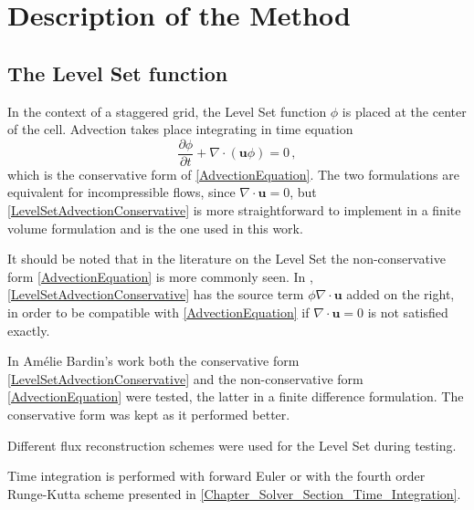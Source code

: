 \documentclass[11pt, a4paper, oneside, openany]{book}
\begin{document}
\section{Description of the Method}\label{Chapter_Implementation_Description_of_the_Method}
\subsection{The Level Set function}
In the context of a staggered grid, the Level Set function $\phi$ is placed at the center of the cell. Advection takes place integrating in time equation
\begin{equation}
\dfrac{\partial\phi}{\partial t}+\nabla\cdot\left(\boldsymbol{u}\phi\right)=0\,,\label{LevelSetAdvectionConservative}
\end{equation}
which is the conservative form of \eqref{AdvectionEquation}. The two formulations are equivalent for incompressible flows, since $\nabla\cdot\boldsymbol{u}=0$, but \eqref{LevelSetAdvectionConservative} is more straightforward to implement in a finite volume formulation and is the one used in this work.\par
It should be noted that in the literature on the Level Set the non-conservative form \eqref{AdvectionEquation} is more commonly seen. In \cite{Zuzio2020}, \eqref{LevelSetAdvectionConservative} has the source term $\phi\nabla\cdot\boldsymbol{u}$ added on the right, in order to be compatible with \eqref{AdvectionEquation} if $\nabla\cdot\boldsymbol{u}=0$ is not satisfied exactly.\par
In Am{\'{e}}lie Bardin's work \cite{Bardin2015} both the conservative form \eqref{LevelSetAdvectionConservative} and the non-conservative form \eqref{AdvectionEquation} were tested, the latter in a finite difference formulation. The conservative form was kept as it performed better.\par
Different flux reconstruction schemes were used for the Level Set during testing.\par
Time integration is performed with forward Euler or with the fourth order Runge-Kutta scheme presented in \ref{Chapter_Solver_Section_Time_Integration}.
\end{document}
